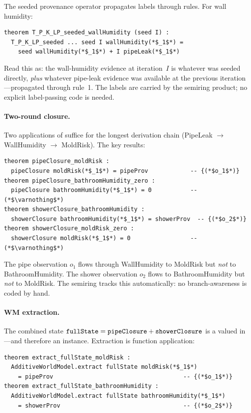 \documentclass[11pt,openany]{report}
\begin{document}
\noindent
The seeded provenance operator 
propagates labels through rules.  For wall humidity:

\begin{lstlisting}[language={}]
theorem T_P_K_LP_seeded_wallHumidity (seed I) :
  T_P_K_LP_seeded ... seed I wallHumidity(*$_1$*) =
    seed wallHumidity(*$_1$*) + I pipeLeak(*$_1$*)
\end{lstlisting}

\noindent
Read this as: the wall-humidity evidence at iteration~$I$ is
whatever was seeded directly, \emph{plus} whatever pipe-leak
evidence was available at the previous iteration---propagated
through rule~1.  The labels are carried by the semiring product;
no explicit label-passing code is needed.

\paragraph{Two-round closure.}
Two applications of  suffice for the
longest derivation chain (PipeLeak $\to$ WallHumidity $\to$
MoldRisk).  The key results:

\begin{lstlisting}[language={}]
theorem pipeClosure_moldRisk :
  pipeClosure moldRisk(*$_1$*) = pipeProv            -- {(*$o_1$*)}
theorem pipeClosure_bathroomHumidity_zero :
  pipeClosure bathroomHumidity(*$_1$*) = 0           -- (*$\varnothing$*)
theorem showerClosure_bathroomHumidity :
  showerClosure bathroomHumidity(*$_1$*) = showerProv  -- {(*$o_2$*)}
theorem showerClosure_moldRisk_zero :
  showerClosure moldRisk(*$_1$*) = 0                 -- (*$\varnothing$*)
\end{lstlisting}

\noindent
The pipe observation $o_1$ flows through WallHumidity to MoldRisk
but \emph{not} to BathroomHumidity.  The shower observation $o_2$
flows to BathroomHumidity but \emph{not} to MoldRisk.  The
 semiring tracks this automatically: no
branch-awareness is coded by hand.

\paragraph{WM extraction.}
The combined state
$\texttt{fullState} = \texttt{pipeClosure} + \texttt{showerClosure}$
is a  valued in ---and therefore an
 instance.  Extraction is function
application:

\begin{lstlisting}[language={}]
theorem extract_fullState_moldRisk :
  AdditiveWorldModel.extract fullState moldRisk(*$_1$*)
    = pipeProv                                     -- {(*$o_1$*)}
theorem extract_fullState_bathroomHumidity :
  AdditiveWorldModel.extract fullState bathroomHumidity(*$_1$*)
    = showerProv                                   -- {(*$o_2$*)}
\end{lstlisting}
\end{document}

